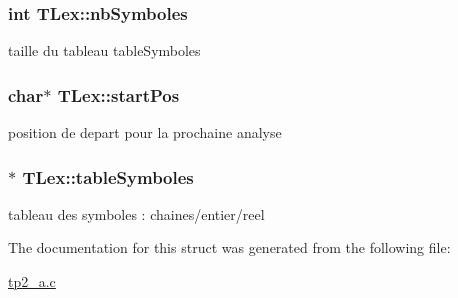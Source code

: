 \subsubsection[{\texorpdfstring{nb\+Symboles}{nbSymboles}}]{\setlength{\rightskip}{0pt plus 5cm}int T\+Lex\+::nb\+Symboles}\hypertarget{structTLex_a84d0d3a30f4b42f8db675f8cbb60373f}{}\label{structTLex_a84d0d3a30f4b42f8db675f8cbb60373f}
taille du tableau table\+Symboles 
\subsubsection[{\texorpdfstring{start\+Pos}{startPos}}]{\setlength{\rightskip}{0pt plus 5cm}char$\ast$ T\+Lex\+::start\+Pos}\hypertarget{structTLex_a1122e1ced17c2c07f7975b4f11110ad8}{}\label{structTLex_a1122e1ced17c2c07f7975b4f11110ad8}
position de depart pour la prochaine analyse 
\subsubsection[{\texorpdfstring{table\+Symboles}{tableSymboles}}]{$\ast$ T\+Lex\+::table\+Symboles}\hypertarget{structTLex_a31a6c4fc0839643e3251a372ba7adf04}{}\label{structTLex_a31a6c4fc0839643e3251a372ba7adf04}
tableau des symboles \+: chaines/entier/reel 

The documentation for this struct was generated from the following file\+:\begin{DoxyCompactItemize}
\item 
\hyperlink{tp2__a_8c}{tp2\+\_\+a.\+c}\end{DoxyCompactItemize}
